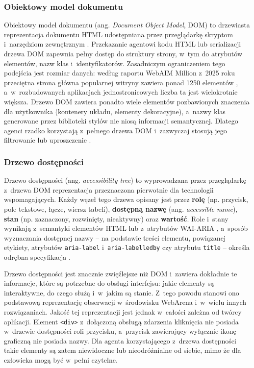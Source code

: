 \subsubsection{Obiektowy model dokumentu}
Obiektowy model dokumentu (ang. \textit{Document Object Model}, DOM) to drzewiasta reprezentacja dokumentu HTML udostępniana przez przeglądarkę skryptom i~narzędziom zewnętrznym \citep{whatwg2025dom}. Przekazanie agentowi kodu HTML lub serializacji drzewa DOM zapewnia pełny dostęp do struktury strony, w~tym do atrybutów elementów, nazw klas i~identyfikatorów. Zasadniczym ograniczeniem tego podejścia jest rozmiar danych: według raportu WebAIM Million z~2025 roku przeciętna strona główna popularnej witryny zawiera ponad 1250 elementów \citep{webaim2025million}, a~w~rozbudowanych aplikacjach jednostronicowych liczba ta jest wielokrotnie większa. Drzewo DOM zawiera ponadto wiele elementów pozbawionych znaczenia dla użytkownika (kontenery układu, elementy dekoracyjne), a~nazwy klas generowane przez biblioteki stylów nie niosą informacji semantycznej. Dlatego agenci rzadko korzystają z~pełnego drzewa DOM i~zazwyczaj stosują jego filtrowanie lub uproszczenie \citep{deng2023mind2web}.

\subsubsection{Drzewo dostępności}
Drzewo dostępności (ang. \textit{accessibility tree}) to wyprowadzana przez przeglądarkę z~drzewa DOM reprezentacja przeznaczona pierwotnie dla technologii wspomagających. Każdy węzeł tego drzewa opisany jest przez \textbf{rolę} (np. przycisk, pole tekstowe, łącze, wiersz tabeli), \textbf{dostępną nazwę} (ang. \textit{accessible name}), \textbf{stan} (np. zaznaczony, rozwinięty, nieaktywny) oraz \textbf{wartość}. Role i~stany wynikają z~semantyki elementów HTML \citep{whatwg2025html} lub z~atrybutów WAI-ARIA \citep{w3c2023aria12}, a~sposób wyznaczania dostępnej nazwy -- na podstawie treści elementu, powiązanej etykiety, atrybutów \texttt{aria-label} i~\texttt{aria-labelledby} czy atrybutu \texttt{title} -- określa odrębna specyfikacja \citep{w3c2024accname}.

Drzewo dostępności jest znacznie zwięźlejsze niż DOM i~zawiera dokładnie te informacje, które są potrzebne do obsługi interfejsu: jakie elementy są interaktywne, do czego służą i~w~jakim są stanie. Z~tego powodu stanowi ono podstawową reprezentację obserwacji w~środowisku WebArena \citep{zhou2024webarena} i~w~wielu innych rozwiązaniach. Jakość tej reprezentacji jest jednak w~całości zależna od twórcy aplikacji. Element \texttt{<div>} z~dołączoną obsługą zdarzenia kliknięcia nie posiada w~drzewie dostępności roli przycisku, a~przycisk zawierający wyłącznie ikonę graficzną nie posiada nazwy. Dla agenta korzystającego z~drzewa dostępności takie elementy są zatem niewidoczne lub nieodróżnialne od siebie, mimo że dla człowieka mogą być w~pełni czytelne.

